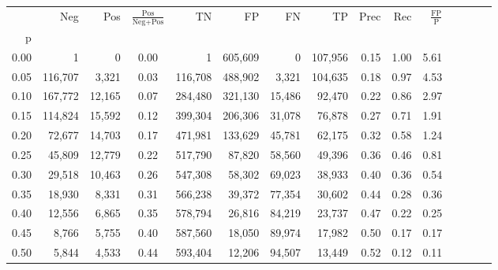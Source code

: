 \begin{tabular}{rrrcrrrrrrrrrrr}
\toprule
{} &      Neg &     Pos & $\frac{\text{Pos}}{\text{Neg}+\text{Pos}}$ &       TN &       FP &       FN &       TP &  Prec &   Rec & $\frac{\text{FP}}{\text{P}}$ \\
p    &          &         &                                            &          &          &          &          &       &       &                              \\
\midrule
0.00 &        1 &       0 &                                       0.00 &        1 &  605,609 &        0 &  107,956 &  0.15 &  1.00 &                         5.61 \\
0.05 &  116,707 &   3,321 &                                       0.03 &  116,708 &  488,902 &    3,321 &  104,635 &  0.18 &  0.97 &                         4.53 \\
0.10 &  167,772 &  12,165 &                                       0.07 &  284,480 &  321,130 &   15,486 &   92,470 &  0.22 &  0.86 &                         2.97 \\
0.15 &  114,824 &  15,592 &                                       0.12 &  399,304 &  206,306 &   31,078 &   76,878 &  0.27 &  0.71 &                         1.91 \\
0.20 &   72,677 &  14,703 &                                       0.17 &  471,981 &  133,629 &   45,781 &   62,175 &  0.32 &  0.58 &                         1.24 \\
0.25 &   45,809 &  12,779 &                                       0.22 &  517,790 &   87,820 &   58,560 &   49,396 &  0.36 &  0.46 &                         0.81 \\
0.30 &   29,518 &  10,463 &                                       0.26 &  547,308 &   58,302 &   69,023 &   38,933 &  0.40 &  0.36 &                         0.54 \\
0.35 &   18,930 &   8,331 &                                       0.31 &  566,238 &   39,372 &   77,354 &   30,602 &  0.44 &  0.28 &                         0.36 \\
0.40 &   12,556 &   6,865 &                                       0.35 &  578,794 &   26,816 &   84,219 &   23,737 &  0.47 &  0.22 &                         0.25 \\
0.45 &    8,766 &   5,755 &                                       0.40 &  587,560 &   18,050 &   89,974 &   17,982 &  0.50 &  0.17 &                         0.17 \\
0.50 &    5,844 &   4,533 &                                       0.44 &  593,404 &   12,206 &   94,507 &   13,449 &  0.52 &  0.12 &                         0.11 \\

\end{tabular}
